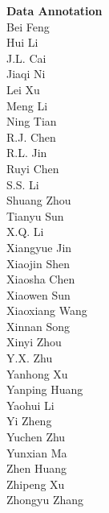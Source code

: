 \documentclass[11pt, a4paper, logo, copyright, nonumbering]{deepseek}
\begin{document}
\begin{CJK*}{UTF8}{gbsn}
\begin{multicols}{2}
\noindent
\textbf{\color{damaigreen} Data Annotation} \\
\color{damaigreen} Bei Feng \\
\color{damaigreen} Hui Li \\
\color{damaigreen} J.L. Cai \\
\color{damaigreen} Jiaqi Ni \\
\color{damaigreen} Lei Xu \\
\color{damaigreen} Meng Li \\
\color{damaigreen} Ning Tian \\
\color{damaigreen} R.J. Chen \\
\color{damaigreen} R.L. Jin \\
\color{damaigreen} Ruyi Chen \\
\color{damaigreen} S.S. Li \\
\color{damaigreen} Shuang Zhou \\
\color{damaigreen} Tianyu Sun \\
\color{damaigreen} X.Q. Li \\
\color{damaigreen} Xiangyue Jin \\
\color{damaigreen} Xiaojin Shen \\
\color{damaigreen} Xiaosha Chen \\
\color{damaigreen} Xiaowen Sun \\
\color{damaigreen} Xiaoxiang Wang \\
\color{damaigreen} Xinnan Song \\
\color{damaigreen} Xinyi Zhou \\
\color{damaigreen} Y.X. Zhu \\
\color{damaigreen} Yanhong Xu \\
\color{damaigreen} Yanping Huang \\
\color{damaigreen} Yaohui Li \\
\color{damaigreen} Yi Zheng \\
\color{damaigreen} Yuchen Zhu \\
\color{damaigreen} Yunxian Ma \\
\color{damaigreen} Zhen Huang \\
\color{damaigreen} Zhipeng Xu \\
\color{damaigreen} Zhongyu Zhang \\


\end{multicols}
\end{CJK*}
\end{document}

